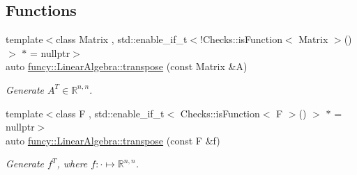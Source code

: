 \subsection*{Functions}
\begin{DoxyCompactItemize}
\item 
{\footnotesize template$<$class Matrix , std\-::enable\-\_\-if\-\_\-t$<$!\-Checks\-::is\-Function$<$ Matrix $>$()$>$ $\ast$  = nullptr$>$ }\\auto \hyperlink{group__LinearAlgebraGroup_gac2512740d1417713c297b71420212f09}{funcy\-::\-Linear\-Algebra\-::transpose} (const Matrix \&A)
\begin{DoxyCompactList}\small\item\em Generate $A^T\in\mathbb{R}^{n,n}$. \end{DoxyCompactList}\item 
{\footnotesize template$<$class F , std\-::enable\-\_\-if\-\_\-t$<$ Checks\-::is\-Function$<$ F $>$() $>$ $\ast$  = nullptr$>$ }\\auto \hyperlink{group__LinearAlgebraGroup_ga6e5faa927c52ea1963be57e501ebdc6c}{funcy\-::\-Linear\-Algebra\-::transpose} (const F \&f)
\begin{DoxyCompactList}\small\item\em Generate $f^T$, where $f:\cdot\mapsto\mathbb{R}^{n,n} $. \end{DoxyCompactList}\end{DoxyCompactItemize}
